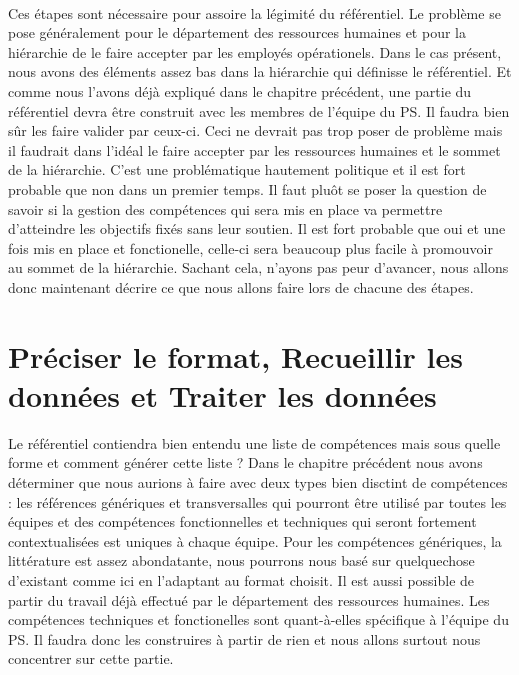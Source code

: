 \paragraph{} Ces étapes sont nécessaire pour assoire la légimité du référentiel. Le problème se pose généralement pour le département des ressources humaines et pour la hiérarchie de le faire accepter par les employés opérationels. Dans le cas présent, nous avons des éléments assez bas dans la hiérarchie qui définisse le référentiel. Et comme nous l'avons déjà expliqué dans le chapitre précédent, une partie du référentiel devra être construit avec les membres de l'équipe du PS. Il faudra bien sûr les faire valider par ceux-ci. Ceci ne devrait pas trop poser de problème mais il faudrait dans l'idéal le faire accepter par les ressources humaines et le sommet de la hiérarchie. C'est une problématique hautement politique et il est fort probable que non dans un premier temps. Il faut pluôt se poser la question de savoir si la gestion des compétences qui sera mis en place va permettre d'atteindre les objectifs fixés sans leur soutien. Il est fort probable que oui et une fois mis en place et fonctionelle, celle-ci sera beaucoup plus facile à promouvoir au sommet de la hiérarchie. Sachant cela, n'ayons pas peur d'avancer, nous allons donc maintenant décrire ce que nous allons faire lors de chacune des étapes. 

\section{Préciser le format, Recueillir les données et Traiter les données}
Le référentiel contiendra bien entendu une liste de compétences mais sous quelle forme et comment générer cette liste ? Dans le chapitre précédent nous avons déterminer que nous aurions à faire avec deux types bien disctint de compétences : les références génériques et transversalles qui pourront être utilisé par toutes les équipes et des compétences fonctionnelles et techniques qui seront fortement contextualisées est uniques à chaque équipe. Pour les compétences génériques, la littérature est assez abondatante, nous pourrons nous basé sur quelquechose d'existant comme ici\citep{exemple_ref} en l'adaptant au format choisit. Il est aussi possible de partir du travail déjà effectué par le département des ressources humaines. Les compétences techniques et fonctionelles sont quant-à-elles spécifique à l'équipe du PS. Il faudra donc les construires à partir de rien et nous allons surtout nous concentrer sur cette partie. 

